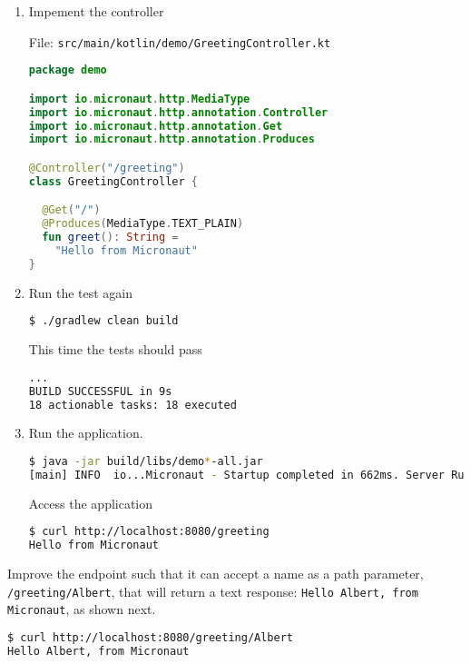 \begin{enumerate}
\item Impement the controller

File: \texttt{src/main/kotlin/demo/GreetingController.kt}

\begin{lstlisting}[language=Kotlin]
package demo

import io.micronaut.http.MediaType
import io.micronaut.http.annotation.Controller
import io.micronaut.http.annotation.Get
import io.micronaut.http.annotation.Produces

@Controller("/greeting")
class GreetingController {

  @Get("/")
  @Produces(MediaType.TEXT_PLAIN)
  fun greet(): String =
    "Hello from Micronaut"
}
\end{lstlisting}

\item Run the test again

\begin{lstlisting}[language=bash]
$ ./gradlew clean build
\end{lstlisting}

This time the tests should pass

\begin{lstlisting}[language=bash]
...
BUILD SUCCESSFUL in 9s
18 actionable tasks: 18 executed
\end{lstlisting}

\item Run the application.

\begin{lstlisting}[language=bash]
$ java -jar build/libs/demo*-all.jar
[main] INFO  io...Micronaut - Startup completed in 662ms. Server Running: http://localhost:8080
\end{lstlisting}

Access the application

\begin{lstlisting}[language=bash]
$ curl http://localhost:8080/greeting
Hello from Micronaut
\end{lstlisting}

\end{enumerate}

Improve the endpoint such that it can accept a name as a path parameter, \texttt{/greeting/Albert}, that will return a text response: \texttt{Hello Albert, from Micronaut}, as shown next.

\begin{lstlisting}[language=bash]
$ curl http://localhost:8080/greeting/Albert
Hello Albert, from Micronaut
\end{lstlisting}

